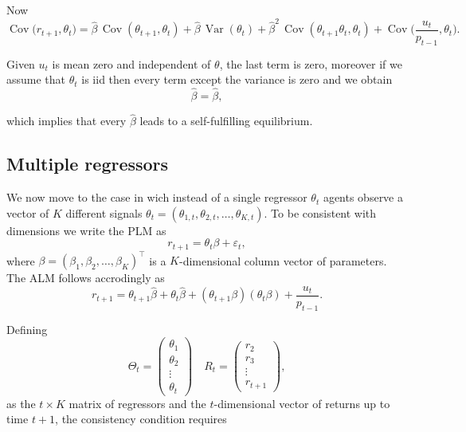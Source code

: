 \documentclass[11pt]{article}
\begin{document}
Now
\begin{equation}
\operatorname{Cov}\big(r_{t+1},\theta_t\big)
= \hat{\beta}\,\operatorname{Cov}(\theta_{t+1},\theta_t)
+ \hat{\beta}\,\operatorname{Var}(\theta_t)
+ \hat{\beta}^2\,\operatorname{Cov}(\theta_{t+1}\theta_t,\theta_t)
+ \operatorname{Cov}\!\Big(\frac{u_t}{p_{t-1}},\theta_t\Big).
\end{equation}

Given $u_t$ is mean zero and independent of $\theta$, the last term is zero, moreover if we assume that $\theta_t$ is iid
then every term except the variance is zero and we obtain
\begin{equation}
\hat{\beta}=\hat{\beta},
\end{equation}

which implies that every $\hat{\beta}$ leads to a self-fulfilling equilibrium.

\subsection{Multiple regressors}
We now move to the case in wich instead of a single regressor $\theta_t$ agents observe a vector of $K$ different signals $\theta_{t} = (\theta_{1,t}, \theta_{2,t}, \ldots, \theta_{K,t})$.
To be consistent with dimensions we write the PLM as
\begin{equation}
r_{t+1} =  \theta_t \beta + \varepsilon_t,
\end{equation}
where $\beta = (\beta_1, \beta_2, \ldots, \beta_K)^\top$ is a $K$-dimensional column vector of parameters.
The ALM follows accrodingly as
\begin{equation}
    r_{t+1} = \theta_{t+1} \hat{\beta}+ \theta_t \hat{\beta}+ (\theta_{t+1} \beta)(\theta_t \beta) + \frac{u_t}{p_{t-1}}.
\end{equation}

Defining 
\begin{equation}
    \Theta_t = \begin{pmatrix}
    \theta_{1} \\
     \theta_{2}\\
        \vdots \\
    \theta_{t} 
\end{pmatrix}
\quad 
R_t = \begin{pmatrix}
    r_{2} \\
     r_{3}\\
        \vdots \\
    r_{t+1}
\end{pmatrix},
\end{equation}
as the $t \times K$ matrix of regressors and the $t$-dimensional vector of returns up to time $t+1$,  the consistency condition requires
\end{document}
